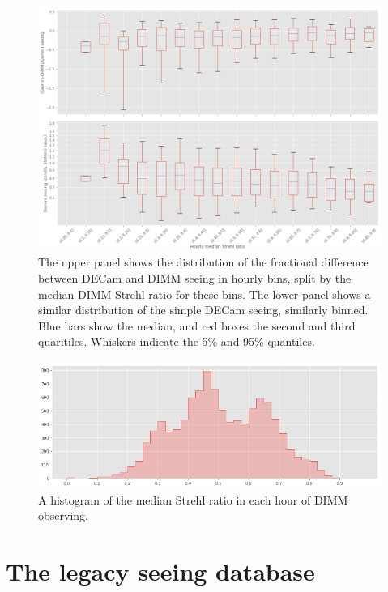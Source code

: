 \documentclass[DM,authoryear,toc]{lsstdoc}
\begin{document}
\begin{figure}
  \includegraphics[width=\columnwidth]{./figures/strehl_boxplots.png}
  \caption{
    The upper panel shows the distribution of the fractional
    difference between DECam and DIMM seeing in hourly bins, split by
    the median DIMM Strehl ratio for these bins. The lower panel shows
    a similar distribution of the simple DECam seeing, similarly
    binned. Blue bars show the median, and red boxes the second and
    third quaritiles. Whiskers indicate the 5\% and 95\% quantiles.
    }
  \label{fig:strehl-boxplots}
\end{figure}

\begin{figure}
  \includegraphics[width=\columnwidth]{./figures/strehl_hist.png}
  \caption{
    A histogram of the median Strehl ratio in each hour of DIMM observing.
  }
  \label{fig:strehl-hist}
\end{figure}

\section{The legacy seeing database}
\end{document}
